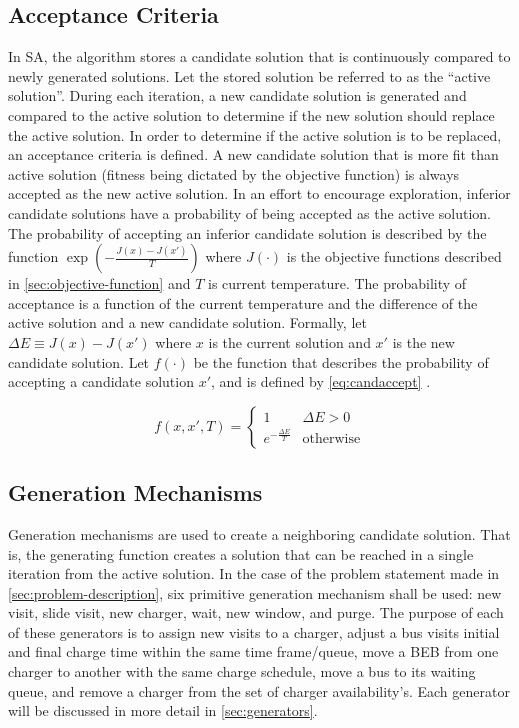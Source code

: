 \documentclass[11pt,a4paper,final]{article}
\newcommand{\Tau}{T}                        %
\begin{document}
\subsection{Acceptance Criteria}
\label{sec:acceptance}
In SA, the algorithm stores a candidate solution that is continuously compared to newly generated solutions. Let the
stored solution be referred to as the ``active solution''. During each iteration, a new candidate solution is generated
and compared to the active solution to determine if the new solution should replace the active solution. In order to
determine if the active solution is to be replaced, an acceptance criteria is defined. A new candidate solution that is
more fit than active solution (fitness being dictated by the objective function) is always accepted as the new active
solution. In an effort to encourage exploration, inferior candidate solutions have a probability of being accepted as
the active solution. The probability of accepting an inferior candidate solution is described by the function
\(\exp(-\frac{J(x) - J(x')}{\Tau})\) where \(J(\cdot)\) is the objective functions described in \ref{sec:objective-function} and
\(\Tau\) is current temperature. The probability of acceptance is a function of the current temperature and the difference
of the active solution and a new candidate solution. Formally, let \(\Delta E \equiv J(x) - J(x')\) where \(x\) is the current
solution and \(x'\) is the new candidate solution. Let \(f(\cdot)\) be the function that describes the probability of accepting
a candidate solution \(x'\), and is defined by \ref{eq:candaccept} \cite{keller-2019-multi-objec}.

\begin{equation}
\label{eq:candaccept}
f(x,x',T) =
\begin{cases}
  1                   & \Delta E > 0 \\
  e^{- \frac{\Delta E}{T}} & \text{otherwise}
\end{cases}
\end{equation}

\subsection{Generation Mechanisms}
\label{sec:generation-mechanisms}
Generation mechanisms are used to create a neighboring candidate solution. That is, the generating function creates a
solution that can be reached in a single iteration from the active solution. In the case of the problem statement made
in \ref{sec:problem-description}, six primitive generation mechanism shall be used: new visit, slide visit, new charger,
wait, new window, and purge. The purpose of each of these generators is to assign new visits to a charger, adjust a bus
visits initial and final charge time within the same time frame/queue, move a BEB from one charger to another with the
same charge schedule, move a bus to its waiting queue, and remove a charger from the set of charger availability's. Each
generator will be discussed in more detail in \ref{sec:generators}.
\end{document}
